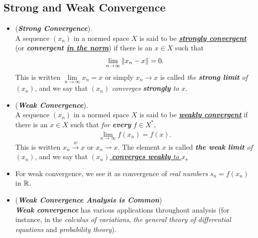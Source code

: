 \documentclass[11pt]{article}
\begin{document}
\subsection{Strong and Weak Convergence}
\begin{itemize}
\item \begin{definition} (\emph{\textbf{Strong Convergence}}). \citep{kreyszig1989introductory}\\
A sequence $(x_n)$ in a normed space $X$ is said to be \underline{\emph{\textbf{strongly convergent}}} (or \emph{\textbf{convergent \underline{in the norm}}}) if
there is  an $x \in X$ such that
\begin{align*}
\lim\limits_{n\rightarrow \infty} \left\|x_n - x\right\|_{} = 0.
\end{align*}
This is written $\lim\limits_{n\rightarrow \infty}x_n = x$ or simply $x_n \rightarrow x$ is called \emph{the \textbf{strong limit} of $(x_n)$}, and we say that $(x_n)$ \emph{converges \textbf{strongly} to $x$}. 
\end{definition}

\item \begin{definition} (\emph{\textbf{Weak Convergence}}). \citep{kreyszig1989introductory}\\
A sequence $(x_n)$ in a normed space $X$ is said to be \underline{\emph{\textbf{weakly convergent}}} if there is an $x \in X$ such that \emph{for \textbf{every}} $f \in X^{*}$,
\begin{align*}
\lim\limits_{n\rightarrow \infty} f(x_n) = f(x).
\end{align*}
This is written $x_n \stackrel{w}{\rightarrow} x$ or $x_n \rightharpoonup x$. The element $x$ is called \emph{\textbf{the weak limit} of $(x_n)$}, and we say
that \underline{$(x_n)$ \emph{\textbf{converges weakly} to $x$.}}
\end{definition}

\item \begin{remark}
For weak convergence, we see it as convergence of \emph{real numbers} $s_n = f(x_n)$ in ${\mathbb R}$.
\end{remark}

\item \begin{remark} (\emph{\textbf{Weak Convergence Analysis is Common}})\\
\emph{\textbf{Weak convergence}} has various applications throughout analysis (for instance, in the \emph{calculus of variations}, \emph{the general theory of
differential equations} and \emph{probability theory}). 


\end{remark}
\end{itemize}
\end{document}
